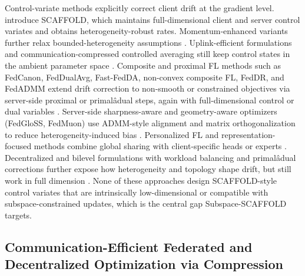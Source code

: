 \documentclass[11pt]{article}
\begin{document}
Control-variate methods explicitly correct client drift at the gradient level. \citet{karimireddy2020scaffold} introduce SCAFFOLD, which maintains full-dimensional client and server control variates and obtains heterogeneity-robust rates. Momentum-enhanced variants further relax bounded-heterogeneity assumptions \citep{Cheng2023MomentumBN}. Uplink-efficient formulations and communication-compressed controlled averaging still keep control states in the ambient parameter space \citep{Huang2023StochasticCA}. Composite and proximal FL methods such as FedCanon, FedDualAvg, Fast-FedDA, non-convex composite FL, FedDR, and FedADMM extend drift correction to non-smooth or constrained objectives via server-side proximal or primalâdual steps, again with full-dimensional control or dual variables \citep{Zhou2025FedCanonNC, yuan2020federated, Bao2022FastCO, zhang2025convex, Tran-Dinh2021FedDRR, Wang2022FedADMMAF}. Server-side sharpness-aware and geometry-aware optimizers (FedGloSS, FedMuon) use ADMM-style alignment and matrix orthogonalization to reduce heterogeneity-induced bias \citep{caldarola2025beyond, liu2025fedmuon}. Personalized FL and representation-focused methods combine global sharing with client-specific heads or experts \citep{wang2024federated, Yu2020HeterogeneousFL, liuflex}. Decentralized and bilevel formulations with workload balancing and primalâdual corrections further expose how heterogeneity and topology shape drift, but still work in full dimension \citep{mohammadabadi2024communication, Kong2024DecentralizedBO, Zhu2024SPARKLEAU, Carnevale2020GTAdamGT, Hu2025ABD}. None of these approaches design SCAFFOLD-style control variates that are intrinsically low-dimensional or compatible with subspace-constrained updates, which is the central gap Subspace-SCAFFOLD targets.

\subsection{Communication-Efficient Federated and Decentralized Optimization via Compression}
\end{document}
